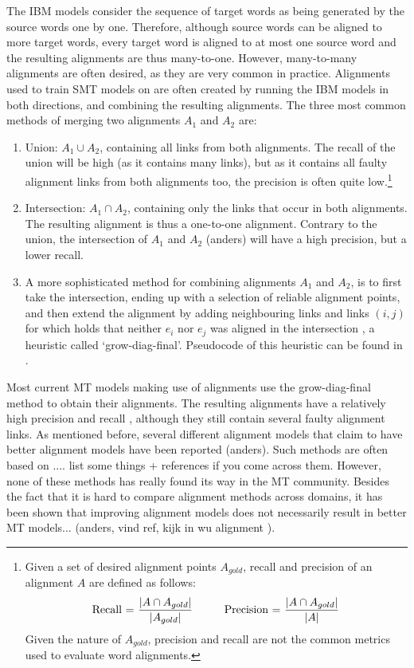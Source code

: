 \documentclass{report}
\theoremstyle{break}
\begin{document}
The IBM models consider the sequence of target words as being generated by the source words one by one. Therefore, although source words can be aligned to more target words, every target word is aligned to at most one source word and the resulting alignments are thus many-to-one. However, many-to-many alignments are often desired, as they are very common in practice. Alignments used to train SMT models on are often created by running the IBM models in both directions, and combining the resulting alignments. The three most common methods of merging two alignments $A_1$ and $A_2$ are:\begin{enumerate}
\item Union: $A_1\cup A_2$, containing all links from both alignments. The recall of the union will be high (as it contains many links), but as it contains all faulty alignment links from both alignments too, the precision is often quite low.\footnote{Given a set of desired alignment points $A_{gold}$, recall and precision of an alignment $A$ are defined as follows:\\
$$\text{Recall = }\frac{|A \cap A_{gold}|}{|A_{gold}|} \text{\hspace{10mm}Precision = }\frac{|A \cap A_{gold}|}{|A|}$$
Given the nature of $A_{gold}$, precision and recall are not the common metrics used to evaluate word alignments.}
\item Intersection: $A_1\cap A_2$, containing only the links that occur in both alignments. The resulting alignment is thus a one-to-one alignment. Contrary to the union, the intersection of $A_1$ and $A_2$ (anders) will have a high precision, but a lower recall.
\item A more sophisticated method for combining alignments $A_1$ and $A_2$, is to first take the intersection, ending up with a selection of reliable alignment points, and then extend the alignment by adding neighbouring links and links $(i,j)$ for which holds that neither $e_i$ nor $e_j$ was aligned in the intersection \citep{och2000improved}, a heuristic called `grow-diag-final'. Pseudocode of this heuristic can be found in \cite{koehn2008statistical}.
\end{enumerate}

Most current MT models making use of alignments use the grow-diag-final method to obtain their alignments. The resulting alignments have a relatively high precision and recall \citep{och2000improved}, although they still contain several faulty alignment links. As mentioned before, several different alignment models that claim to have better alignment models have been reported (anders). Such methods are often based on .... list some things + references if you come across them. However, none of these methods has really found its way in the MT community. Besides the fact that it is hard to compare alignment methods across domains, it has been shown that improving alignment models does not necessarily result in better MT models... (anders, vind ref, kijk in wu alignment \cite{indurkhya2010handbook}).
\end{document}
